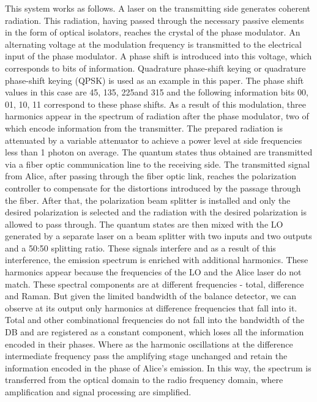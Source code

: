 {\begin{figure}
    \label{fig:het true scheme syn}
\end{figure}
This system works as follows. A laser on the transmitting side generates coherent radiation. This radiation, having passed through the necessary passive elements in the form of optical isolators, reaches the crystal of the phase modulator. An alternating voltage at the modulation frequency is transmitted to the electrical input of the phase modulator. A phase shift is introduced into this voltage, which corresponds to bits of information. Quadrature phase-shift keying or quadrature phase-shift keying (QPSK) is used as an example in this paper. The phase shift values in this case are {45\textdegree, 135\textdegree, 225\textdegree and 315\textdegree} and the following information bits {00, 01, 10, 11} correspond to these phase shifts. As a result of this modulation, three harmonics appear in the spectrum of radiation after the phase modulator, two of which encode information from the transmitter. The prepared radiation is attenuated by a variable attenuator to achieve a power level at side frequencies less than 1 photon on average. The quantum states thus obtained are transmitted via a fiber optic communication line to the receiving side.  
\newline The transmitted signal from Alice, after passing through the fiber optic link, reaches the polarization controller to compensate for the distortions introduced by the passage through the fiber. After that, the polarization beam splitter is installed and only the desired polarization is selected and the radiation with the desired polarization is allowed to pass through. The quantum states are then mixed with the LO generated by a separate laser on a beam splitter with two inputs and two outputs and a 50:50 splitting ratio. These signals interfere and as a result of this interference, the emission spectrum is enriched with additional harmonics. These harmonics appear because the frequencies of the LO and the Alice laser do not match. These spectral components are at different frequencies - total, difference and Raman. But given the limited bandwidth of the balance detector, we can observe at its output only harmonics at difference frequencies that fall into it. Total and other combinational frequencies do not fall into the bandwidth of the DB and are registered as a constant component, which loses all the information encoded in their phases. Where as the harmonic oscillations at the difference intermediate frequency pass the amplifying stage unchanged and retain the information encoded in the phase of Alice's emission. In this way, the spectrum is transferred from the optical domain to the radio frequency domain, where amplification and signal processing are simplified.
}
